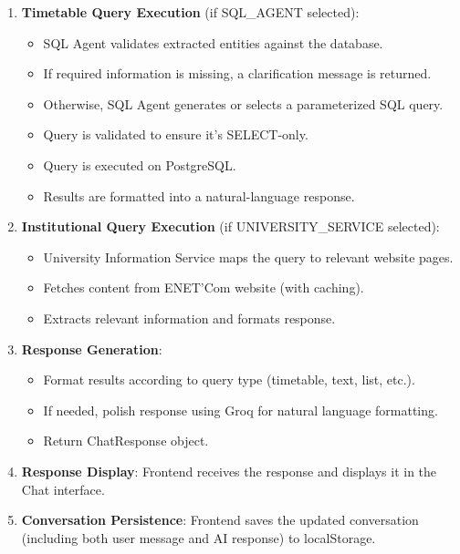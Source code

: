 \begin{enumerate}
    \item \textbf{Timetable Query Execution} (if SQL\_AGENT selected):
    \begin{itemize}
        \item SQL Agent validates extracted entities against the database.
        \item If required information is missing, a clarification message is returned.
        \item Otherwise, SQL Agent generates or selects a parameterized SQL query.
        \item Query is validated to ensure it's SELECT-only.
        \item Query is executed on PostgreSQL.
        \item Results are formatted into a natural-language response.
    \end{itemize}
    
    \item \textbf{Institutional Query Execution} (if UNIVERSITY\_SERVICE selected):
    \begin{itemize}
        \item University Information Service maps the query to relevant website pages.
        \item Fetches content from ENET'Com website (with caching).
        \item Extracts relevant information and formats response.
    \end{itemize}
    
    \item \textbf{Response Generation}:
    \begin{itemize}
        \item Format results according to query type (timetable, text, list, etc.).
        \item If needed, polish response using Groq for natural language formatting.
        \item Return ChatResponse object.
    \end{itemize}
    
    \item \textbf{Response Display}: Frontend receives the response and displays it in the Chat interface.
    
    \item \textbf{Conversation Persistence}: Frontend saves the updated conversation (including both user message and AI response) to localStorage.
\end{enumerate}

